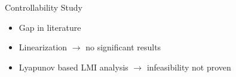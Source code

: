 \begin{frame}{Controllability Study}
\begin{itemize}
    \item Gap in literature
    \item Linearization $\longrightarrow$ no significant results
    \item Lyapunov based LMI analysis $\longrightarrow$ infeasibility not proven
\end{itemize}
\end{frame}


	
